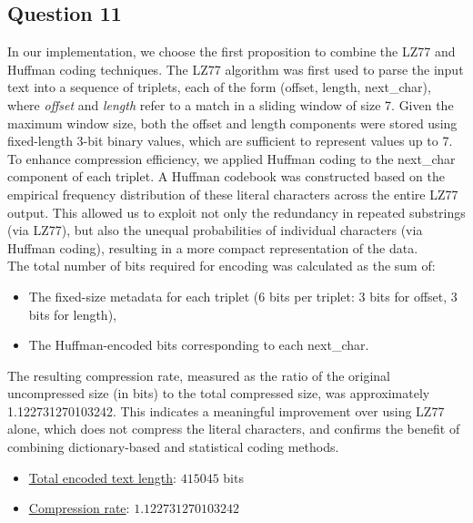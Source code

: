 \documentclass[]{template}
\begin{document}
    \subsection{Question 11}

    In our implementation, we choose the first proposition to combine the LZ77 and Huffman coding techniques. 
    The LZ77 algorithm was first used to parse the input text into a sequence of triplets, 
    each of the form (offset, length, next\_char), where \textit{offset} and \textit{length} refer to a match 
    in a sliding window of size 7. 
    Given the maximum window size, both the offset and length components were stored using 
    fixed-length 3-bit binary values, which are sufficient to represent values up to 7.\\

    \noindent
    To enhance compression efficiency, we applied Huffman coding to the next\_char component of each triplet. 
    A Huffman codebook was constructed based on the empirical frequency distribution of these literal characters 
    across the entire LZ77 output. This allowed us to exploit not only the redundancy in repeated substrings (via LZ77), 
    but also the unequal probabilities of individual characters (via Huffman coding), resulting in a more compact representation of the data.\\

    \noindent
    The total number of bits required for encoding was calculated as the sum of:

    \begin{itemize}
        \item The fixed-size metadata for each triplet (6 bits per triplet: 3 bits for offset, 3 bits for length),
        \item The Huffman-encoded bits corresponding to each next\_char.
    \end{itemize}

    \noindent
    The resulting compression rate, measured as the ratio of the original uncompressed size (in bits) 
    to the total compressed size, was approximately 1.122731270103242. 
    This indicates a meaningful improvement over using LZ77 alone, which does not compress the literal 
    characters, and confirms the benefit of combining dictionary-based and statistical coding methods.

    \begin{itemize}
        \item \underline{Total encoded text length}: $415045$ bits
        \item \underline{Compression rate}: $1.122731270103242$
    \end{itemize}
\end{document}
